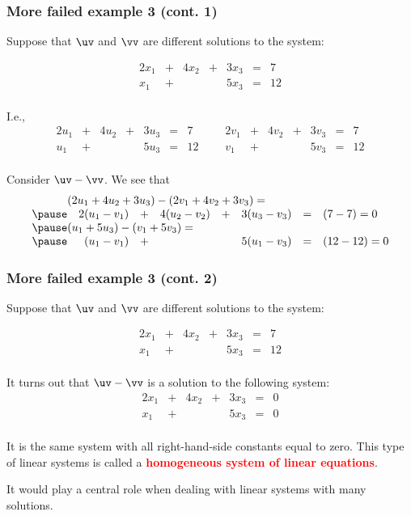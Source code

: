 \begin{frame}
  \frametitle{More failed example 3 (cont. 1)}

  Suppose that $\uv$ and $\vv$ are different solutions to the system:

  {\footnotesize
  \[
  \begin{array}{rcrcrcl}
    2x_1 & + & 4x_2 & + & 3x_3 & = & 7 \\
    x_1 & + &  &  & 5x_3 & = & 12 \\
  \end{array}
  \]
  }

  I.e.,
  {\footnotesize
  \[
  \begin{array}{rcrcrclcrcrcrcl}
    2u_1 & + & 4u_2 & + & 3u_3 & = & 7 & \ \ \ \ \ \ \
    2v_1 & + & 4v_2 & + & 3v_3 & = & 7 \\
    u_1 & + &  &  & 5u_3 & = & 12 &  \ \ \ \ \ \ \
    v_1 & + &  &  & 5v_3 & = & 12 \\
  \end{array}
  \]
  }
  
  Consider $\uv - \vv$. \pause
  We see that
  {\footnotesize
  \[
  \begin{array}{rrcrcrcl}
    \lefteqn{(2u_1 + 4u_2 + 3u_3) - (2v_1  + 4v_2 + 3v_3) = } & \\
    \pause
    & 2(u_1-v_1) & + & 4(u_2 - v_2) & + & 3(u_3-v_3) & = & (7-7) = 0 \\
    \pause
    \lefteqn{(u_1+5u_3) - (v_1+5v_3) = } & \\
    \pause
    & (u_1-v_1) & + &  &  & 5(u_1-v_3) & = & (12-12) = 0 \\
  \end{array}
  \]
  }
\end{frame}

\begin{frame}
  \frametitle{More failed example 3 (cont. 2)}

  Suppose that $\uv$ and $\vv$ are different solutions to the system:

  {\footnotesize
  \[
  \begin{array}{rcrcrcl}
    2x_1 & + & 4x_2 & + & 3x_3 & = & 7 \\
    x_1 & + &  &  & 5x_3 & = & 12 \\
  \end{array}
  \]
  }

  It turns out that $\uv-\vv$ is a solution to the following system:
  {\footnotesize
  \[
  \begin{array}{rcrcrcl}
    2x_1 & + & 4x_2 & + & 3x_3 & = & 0 \\
    x_1 & + &  &  & 5x_3 & = & 0 \\
  \end{array}
  \]
  }

  \pause It is the same system with all right-hand-side constants
  equal to zero.  This type of linear systems is called a
  \textcolor{red}{\bf homogeneous system of linear equations}.

  \pause It would play a central role when dealing with linear systems
  with many solutions.
  
\end{frame}

